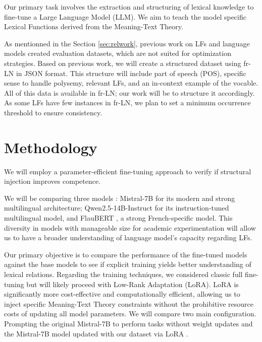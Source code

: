 \documentclass[11pt]{article}
\begin{document}
Our primary task involves the extraction and structuring of lexical knowledge
to fine-tune a Large Language Model (LLM). We aim to teach the model specific
Lexical Functions derived from the Meaning-Text Theory.

As mentionned in the Section \ref{sec:relwork}, previous work on LFs and
language models created evaluation datasets, which are not suited for
optimization strategies. Based on previous work, we will create a structured
dataset using fr-LN \citep{11403/lexical-system-fr/v3.2} in JSON format. This
structure will include part of speech (POS), specific sense to handle polysemy,
relevant LFs, and an in-context example of the vocable. All of this data is
available in fr-LN; our work will be to structure it accordingly. As some LFs
have few instances in fr-LN, we plan to set a minimum occurrence threshold to
ensure consistency.


\section{Methodology}
We will employ a parameter-efficient fine-tuning approach to verify if
structural injection improves competence.

We will be comparing three models : Mistral-7B
\citep{jiangMistral7B2023} for its modern and strong multilingual architecture;
Qwen2.5-14B-Instruct \citep{qwen2} for its instruction-tuned multilingual
model, and FlauBERT \citep{leFlauBERTUnsupervisedLanguage2020}, a strong
French-specific model. This diversity in models with manageable size for
academic experimentation will allow us to have a
broader understanding of language model's capacity regarding LFs.

Our primary objective is to compare the performance of the fine-tuned models
against the base models to see if explicit training yields better understanding
of lexical relations. Regarding the training techniques, we considered classic
full fine-tuning but will likely proceed with Low-Rank Adaptation (LoRA). LoRA
is significantly more cost-effective and computationally efficient, allowing us
to inject specific Meaning-Text Theory constraints without the prohibitive
resource costs of updating all model parameters. We will compare two main
configuration. Prompting the original Mistral-7B to perform tasks without
weight updates and the Mistral-7B model updated with our dataset via LoRA
\citep{LoRA}.
\end{document}
